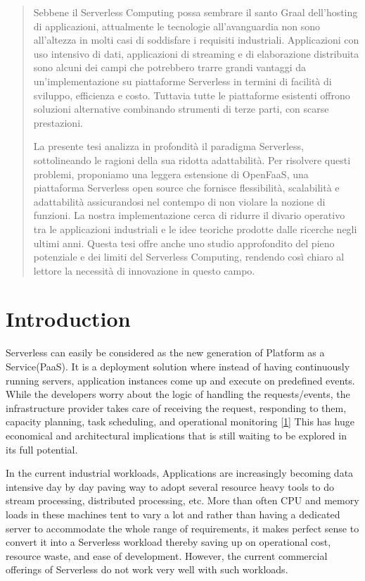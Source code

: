 \documentclass[12pt,titlepage]{article}
\begin{document}
\begin{abstract}
Sebbene il Serverless Computing possa sembrare il santo Graal dell’hosting di applicazioni, attualmente le tecnologie all’avanguardia non sono all’altezza in molti casi di soddisfare i requisiti industriali. Applicazioni con uso intensivo di dati, applicazioni di streaming e di elaborazione distribuita sono alcuni dei campi che potrebbero trarre grandi vantaggi da un’implementazione su piattaforme Serverless in termini di facilità di sviluppo, efficienza e costo. Tuttavia tutte le piattaforme esistenti offrono soluzioni alternative combinando strumenti di terze parti, con scarse prestazioni.

La presente tesi analizza in profondità il paradigma Serverless, sottolineando le ragioni della sua ridotta adattabilità. Per risolvere questi problemi, proponiamo una leggera estensione di OpenFaaS, una piattaforma Serverless open source che fornisce flessibilità, scalabilità e adattabilità assicurandosi nel contempo di non violare la nozione di funzioni. La nostra implementazione cerca di ridurre il divario operativo tra le applicazioni industriali e le idee teoriche prodotte dalle ricerche negli ultimi anni. Questa tesi offre anche uno studio approfondito del pieno potenziale e dei limiti del Serverless Computing, rendendo così chiaro al lettore la necessità di innovazione in questo campo.

\end{abstract}



\setcounter{tocdepth}{5}
\tableofcontents

\listoffigures
\listoftables

\section{Introduction}
\label{sec:orgffdd62d}

Serverless can easily be considered as the new generation of Platform as a
Service(PaaS). It is a deployment solution where instead of having continuously
running servers, application instances come up and execute on predefined events.
While the developers worry about
the logic of handling the requests/events, the infrastructure provider takes
care of receiving the request, responding to them, capacity planning, task
scheduling, and operational monitoring \hyperref[ref:1]{[1}]
This has huge economical and architectural implications that is
still waiting to be explored in its full potential.

In the current industrial workloads, Applications are increasingly becoming data intensive
day by day paving way to adopt several resource heavy tools to do stream
processing, distributed processing, etc. More than often CPU and memory loads in
these machines tent to vary a lot and rather than having a dedicated server to accommodate the whole range
of requirements, it makes perfect sense to convert it into a Serverless workload
thereby saving up on operational cost, resource waste, and ease of development.
However, the current commercial offerings of Serverless do not work
very well with such workloads.
\end{document}
